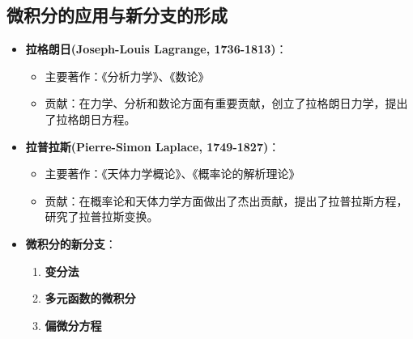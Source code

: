 \documentclass{Math_Note}
\begin{document}
\subsection{微积分的应用与新分支的形成}
\begin{itemize}
    \item \textbf{拉格朗日(Joseph-Louis Lagrange, 1736-1813)}：
    \begin{itemize}
        \item 主要著作：《分析力学》、《数论》
        \item 贡献：在力学、分析和数论方面有重要贡献，创立了拉格朗日力学，提出了拉格朗日方程。
    \end{itemize}
    
    \item \textbf{拉普拉斯(Pierre-Simon Laplace, 1749-1827)}：
    \begin{itemize}
        \item 主要著作：《天体力学概论》、《概率论的解析理论》
        \item 贡献：在概率论和天体力学方面做出了杰出贡献，提出了拉普拉斯方程，研究了拉普拉斯变换。
    \end{itemize}

    \item \textbf{微积分的新分支}：
    \begin{enumerate}
        \item \textbf{变分法}
        \item \textbf{多元函数的微积分}
        \item \textbf{偏微分方程}
    \end{enumerate}
\end{itemize}
\end{document}
